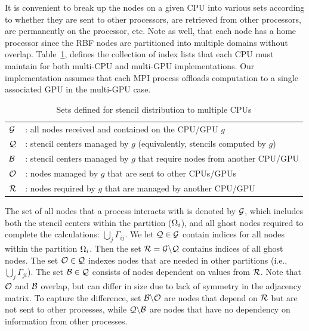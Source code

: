 \documentclass{report}
\begin{document}
It is convenient to break up the nodes on a given CPU into various sets
according to whether they are sent to other processors, are retrieved from 
other processors, are permanently on the processor, etc. Note as well, 
that each node has a home processor since the RBF nodes are partitioned into 
multiple domains without overlap.
Table~\ref{tbl:stencil_sets}, defines the collection of index lists that each CPU must maintain for both multi-CPU and multi-GPU implementations. Our implementation assumes that each MPI process offloads computation to a single associated GPU in the multi-GPU case. 

        \begin{table}[t]
            \begin{center}
                \caption{Sets defined for stencil distribution to multiple CPUs}
                            \label{tbl:stencil_sets}
                \begin{tabular}{l l}
                    \hline
                    $\mathcal{G}$ &: all nodes received and contained on the CPU/GPU $g$ \\
                    $\mathcal{Q}$ &: stencil centers managed by $g$ 
					(equivalently, stencils computed by $g$) \\
                    $\mathcal{B}$ &: stencil centers managed by $g$ that
                    require nodes from another CPU/GPU \\
                    $\mathcal{O}$ &: nodes managed by $g$ that are sent to other CPUs/GPUs  \\
                    $\mathcal{R}$ &: nodes required by $g$ that are managed by another CPU/GPU \\
                    \hline
                \end{tabular}
            \end{center}
        \end{table}
        
        The set of all nodes that a process interacts with is denoted by $\mathcal{G}$, which includes both the stencil centers within the partition ($\Omega_i$), and all ghost nodes required to complete the calculations: $\bigcup_{j} \Gamma_{ij}$.  
We let $\mathcal{Q}\in\mathcal{G}$ contain indices for all nodes within the partition $\Omega_i$. 
Then the set $\mathcal{R} = \mathcal{G} \backslash \mathcal{Q}$ contains indices of all ghost nodes. 
The set $\mathcal{O}\in\mathcal{Q}$ indexes nodes that are needed in other partitions (i.e., $\bigcup_j \Gamma_{ji}$). The set $\mathcal{B}\in\mathcal{Q}$ consists of nodes dependent on values from $\mathcal{R}$. Note that $\mathcal{O}$ and $\mathcal{B}$ overlap, but can differ in size due to lack of symmetry in the adjacency matrix. To capture the difference, set $\mathcal{B} \backslash \mathcal{O}$ are nodes that depend on $\mathcal{R}$ but are not sent to other processes, while $\mathcal{Q} \backslash \mathcal{B}$ are nodes that have no dependency on information from other processes.
\end{document}
